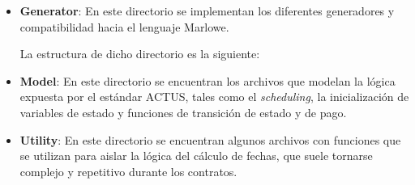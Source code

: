 \documentclass{beamer}
\begin{document}
\begin{frame}[fragile]
\begin{itemize}
    \item \textbf{Generator}: En este directorio se implementan los diferentes generadores y compatibilidad hacia el lenguaje
Marlowe.
    
    \medskip

    \pause La estructura de dicho directorio es la siguiente:


\end{itemize}
\end{frame}

\begin{frame}[fragile]
    \begin{itemize}
        \item \textbf{Model}: En este directorio se encuentran los archivos que modelan la lógica expuesta por el estándar ACTUS, tales como el \textit{scheduling}, la inicialización de variables de estado y funciones de transición de estado y de pago.
            \pause

            \pause
        \item \textbf{Utility}: En este directorio se encuentran algunos archivos con funciones que se utilizan para aislar la lógica del cálculo de fechas, que suele tornarse complejo y repetitivo durante los contratos.


    \end{itemize}
\end{frame}
\end{document}
